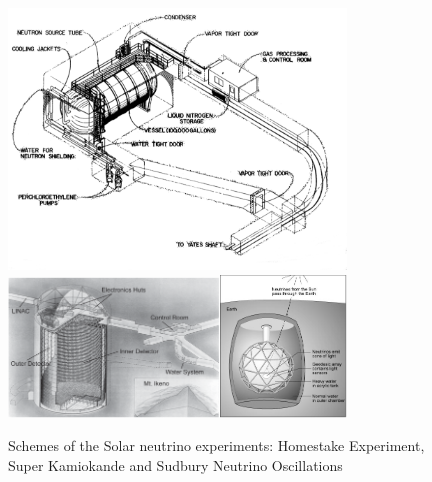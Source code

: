 \begin{figure}
\caption{Schemes of the Solar neutrino experiments: Homestake Experiment, Super Kamiokande and Sudbury Neutrino Oscillations}
\label{fig:history_Schemes}
\centering
\includegraphics[width=0.80\textwidth, keepaspectratio=true]{figs/history_Homestake01.png}
\includegraphics[width=0.50\textwidth, keepaspectratio=true]{figs/history_SuperK01.png}\includegraphics[width=0.30\textwidth, keepaspectratio=true]{figs/history_SNO01.png}
\end{figure}

